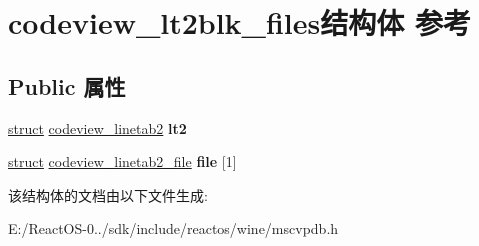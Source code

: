 \hypertarget{structcodeview__lt2blk__files}{}\section{codeview\+\_\+lt2blk\+\_\+files结构体 参考}
\label{structcodeview__lt2blk__files}
\subsection*{Public 属性}
\begin{DoxyCompactItemize}
\item 
\mbox{\label{structcodeview__lt2blk__files_a43e94129b091dce1f25787da99925eb7}} 
\hyperlink{interfacestruct}{struct} \hyperlink{structcodeview__linetab2}{codeview\+\_\+linetab2} {\bfseries lt2}
\item 
\mbox{\label{structcodeview__lt2blk__files_a45ef5905a737f8928a6b8139aa13e2f7}} 
\hyperlink{interfacestruct}{struct} \hyperlink{structcodeview__linetab2__file}{codeview\+\_\+linetab2\+\_\+file} {\bfseries file} \mbox{[}1\mbox{]}
\end{DoxyCompactItemize}


该结构体的文档由以下文件生成\+:\begin{DoxyCompactItemize}
\item 
E\+:/\+React\+O\+S-\/0../sdk/include/reactos/wine/mscvpdb.\+h\end{DoxyCompactItemize}
